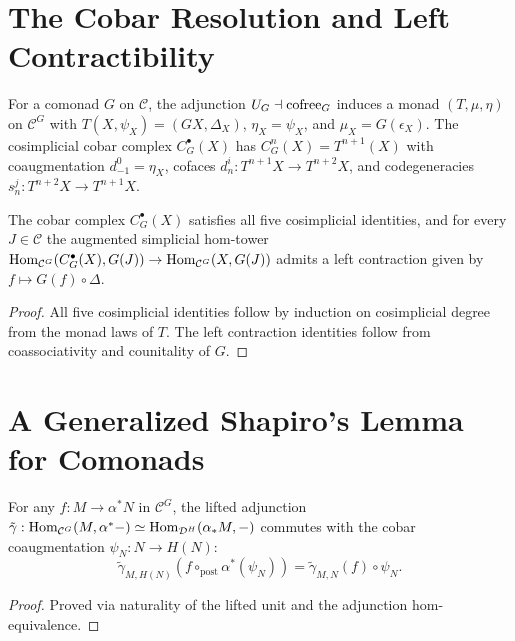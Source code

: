 \section{The Cobar Resolution and Left Contractibility}

\begin{definition}
  \label{defn:cobar_complex}
  \leanok
  For a comonad $G$ on $\mathcal{C}$, the adjunction $U_G \dashv \operatorname{cofree}_G$ induces a monad $(T, \mu, \eta)$ on $\mathcal{C}^G$ with $T(X, \psi_X) = (GX, \Delta_X)$, $\eta_X = \psi_X$, and $\mu_X = G(\epsilon_X)$. The cosimplicial cobar complex $C^{\bullet}_G(X)$ has $C^n_G(X) = T^{n+1}(X)$ with coaugmentation $d^0_{-1} = \eta_X$, cofaces $d^i_n : T^{n+1}X \to T^{n+2}X$, and codegeneracies $s^j_n : T^{n+2}X \to T^{n+1}X$.
\end{definition}

\begin{proposition}
  \label{prop:cobar_contractible}
  \leanok
  The cobar complex $C^{\bullet}_G(X)$ satisfies all five cosimplicial identities, and for every $J \in \mathcal{C}$ the augmented simplicial hom-tower $\operatorname{Hom}_{\mathcal{C}^G}(C^{\bullet}_G(X), G(J)) \to \operatorname{Hom}_{\mathcal{C}^G}(X, G(J))$ admits a left contraction given by $f \mapsto G(f) \circ \Delta$.
\end{proposition}
\begin{proof}
  \leanok
  All five cosimplicial identities follow by induction on cosimplicial degree from the monad laws of $T$. The left contraction identities follow from coassociativity and counitality of $G$.
\end{proof}

\section{A Generalized Shapiro's Lemma for Comonads}

\begin{proposition}
  \label{prop:shapiro_triangle}
  \leanok
  For any $f : M \to \alpha^* N$ in $\mathcal{C}^G$, the lifted adjunction $\tilde{\gamma} : \operatorname{Hom}_{\mathcal{C}^G}(M, \alpha^* -) \simeq \operatorname{Hom}_{\mathcal{D}^H}(\alpha_* M, -)$ commutes with the cobar coaugmentation $\psi_N : N \to H(N)$:
  \[
    \tilde{\gamma}_{M, H(N)}(f \circ_{\text{post}} \alpha^*(\psi_N)) = \tilde{\gamma}_{M, N}(f) \circ \psi_N.
  \]
\end{proposition}
\begin{proof}
  \leanok
  Proved via naturality of the lifted unit and the adjunction hom-equivalence.
\end{proof}

